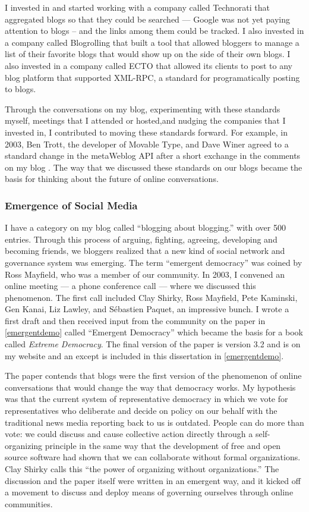 I invested in and started working with a company called Technorati that aggregated blogs so that they could be searched --- Google was not yet paying attention to blogs -- and the links among them could be tracked. I also invested in a company called Blogrolling that built a tool that allowed bloggers to manage a list of their favorite blogs that would show up on the side of their own blogs. I also invested in a company called ECTO that allowed its clients to post to any blog platform that supported XML-RPC, a standard for programatically posting to blogs.

Through the conversations on my blog, experimenting with these standards myself, meetings that I attended or hosted,and nudging the companies that I invested in, I contributed to moving these standards forward. For example, in 2003, Ben Trott, the developer of Movable Type, and Dave Winer agreed to a standard change in the metaWeblog \ac{API} after a short exchange in the comments on my blog \cite{metaWebl87:online}. The way that we discussed these standards on our blogs became the basis for thinking about the future of online conversations.

\subsubsection{Emergence of Social Media}
\label{sec:emergentdemo}

I have a category on my blog called ``blogging about blogging.'' with over 500 entries. Through this process of arguing, fighting, agreeing, developing and becoming friends, we bloggers realized that a new kind of social network and governance system was emerging. The term ``emergent democracy'' was coined by Ross Mayfield, who was a member of our community. In 2003, I convened an online meeting --- a phone conference call --- where we discussed this phenomenon. The first call included Clay Shirky, Ross Mayfield, Pete Kaminski, Gen Kanai, Liz Lawley, and Sébastien Paquet, an impressive bunch. I wrote a first draft and then received input from the community on the paper in \autoref{emergentdemo} called ``Emergent Democracy'' which became the basis for a book called \emph{Extreme Democracy}. The final version of the paper is version 3.2 and is on my website \cite{1Emergen42:online} and an except is included in this dissertation in \autoref{emergentdemo}.

The paper contends that blogs were the first version of the phenomenon of online conversations that would change the way that democracy works. My hypothesis was that the current system of representative democracy in which we vote for representatives who deliberate and decide on policy on our behalf with the traditional news media reporting back to us is outdated. People can do more than vote: we could discuss and cause collective action directly through a self-organizing principle in the same way that the development of free and open source software had shown that we can collaborate without formal organizations. Clay Shirky calls this ``the power of organizing without organizations.'' The discussion and the paper itself were written in an emergent way, and it kicked off a movement to discuss and deploy means of governing ourselves through online communities.

